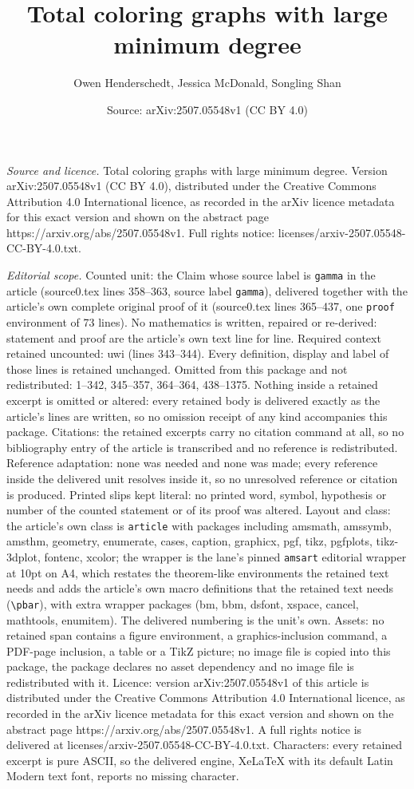 \documentclass[10pt,a4paper]{amsart}
\title[Total coloring graphs with large minimum degree]{Total coloring graphs with large minimum degree}
\author{Owen Henderschedt, Jessica McDonald, Songling Shan}
\date{Source: arXiv:2507.05548v1 (CC BY 4.0)}
\begin{document}
\maketitle

\noindent\emph{Source and licence.} Total coloring graphs with large minimum degree. Version arXiv:2507.05548v1 (CC BY 4.0), distributed under the Creative Commons Attribution 4.0 International licence, as recorded in the arXiv licence metadata for this exact version and shown on the abstract page https://arxiv.org/abs/2507.05548v1. Full rights notice: licenses/arxiv-2507.05548-CC-BY-4.0.txt.\par\smallskip

\noindent\textit{Editorial scope.} Counted unit: the Claim whose source label is \texttt{gamma} in the article (source0.tex lines 358--363, source label \texttt{gamma}), delivered together with the article's own complete original proof of it (source0.tex lines 365--437, one \texttt{proof} environment of 73 lines). No mathematics is written, repaired or re-derived: statement and proof are the article's own text line for line. Required context retained uncounted: uwi (lines 343--344). Every definition, display and label of those lines is retained unchanged. Omitted from this package and not redistributed: 1--342, 345--357, 364--364, 438--1375. Nothing inside a retained excerpt is omitted or altered: every retained body is delivered exactly as the article's lines are written, so no omission receipt of any kind accompanies this package. Citations: the retained excerpts carry no citation command at all, so no bibliography entry of the article is transcribed and no reference is redistributed. Reference adaptation: none was needed and none was made; every reference inside the delivered unit resolves inside it, so no unresolved reference or citation is produced. Printed slips kept literal: no printed word, symbol, hypothesis or number of the counted statement or of its proof was altered. Layout and class: the article's own class is \texttt{article} with packages including amsmath, amssymb, amsthm, geometry, enumerate, cases, caption, graphicx, pgf, tikz, pgfplots, tikz-3dplot, fontenc, xcolor; the wrapper is the lane's pinned \texttt{amsart} editorial wrapper at 10pt on A4, which restates the theorem-like environments the retained text needs and adds the article's own macro definitions that the retained text needs (\texttt{\textbackslash pbar}), with extra wrapper packages (bm, bbm, dsfont, xspace, cancel, mathtools, enumitem). The delivered numbering is the unit's own. Assets: no retained span contains a figure environment, a graphics-inclusion command, a PDF-page inclusion, a table or a TikZ picture; no image file is copied into this package, the package declares no asset dependency and no image file is redistributed with it. Licence: version arXiv:2507.05548v1 of this article is distributed under the Creative Commons Attribution 4.0 International licence, as recorded in the arXiv licence metadata for this exact version and shown on the abstract page https://arxiv.org/abs/2507.05548v1. A full rights notice is delivered at licenses/arxiv-2507.05548-CC-BY-4.0.txt. Characters: every retained excerpt is pure ASCII, so the delivered engine, XeLaTeX with its default Latin Modern text font, reports no missing character.
\end{document}
